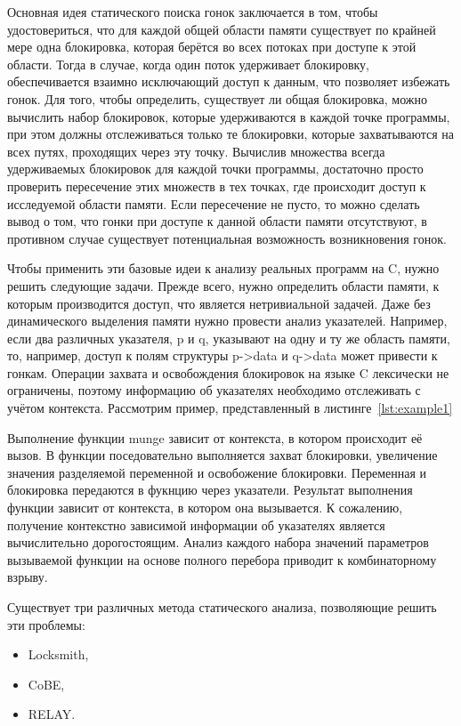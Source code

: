 Основная идея статического поиска гонок заключается в том, чтобы удостовериться, что для каждой общей области памяти существует по крайней мере одна блокировка, которая берётся во всех потоках при доступе к этой области. Тогда в случае, когда один поток удерживает блокировку, обеспечивается взаимно исключающий доступ к данным, что позволяет избежать гонок. Для того, чтобы определить, существует ли общая блокировка, можно вычислить набор блокировок, которые удерживаются в каждой точке программы, при этом должны отслеживаться только те блокировки, которые захватываются на всех путях, проходящих через эту точку. Вычислив множества всегда удерживаемых блокировок для каждой точки программы, достаточно просто проверить пересечение этих множеств в тех точках, где происходит доступ к исследуемой области памяти. Если пересечение не пусто, то можно сделать вывод о том, что гонки при доступе к данной области памяти отсутствуют, в противном случае существует потенциальная возможность возникновения гонок.

Чтобы применить эти базовые идеи к анализу реальных программ на C, нужно решить следующие задачи. Прежде всего, нужно определить области памяти, к которым производится доступ, что является нетривиальной задачей. Даже без динамического выделения памяти нужно провести анализ указателей. Например, если два различных указателя, p и q, указывают на одну и ту же область памяти, то, например, доступ к полям структуры p->data и q->data может привести к гонкам. Операции захвата и освобождения блокировок на языке C лексически не ограничены, поэтому информацию об указателях необходимо отслеживать с учётом контекста. Рассмотрим пример, представленный в листинге~\ref{lst:example1} 



Выполнение функции munge зависит от контекста, в котором происходит её вызов. В функции поседовательно выполняется захват блокировки, увеличение значения разделяемой переменной и освобожение блокировки. Переменная и блокировка передаются в фукнцию через указатели. Результат выполнения функции зависит от контекста, в котором она вызывается. К сожалению, получение контекстно зависимой информации об указателях является вычислительно дорогостоящим. Анализ каждого набора значений параметров вызываемой функции на основе полного перебора приводит к комбинаторному взрыву.

Существует три различных метода статического анализа, позволяющие решить эти проблемы:
\begin{itemize}
\item Locksmith,
\item CoBE,
\item RELAY.
\end{itemize}

